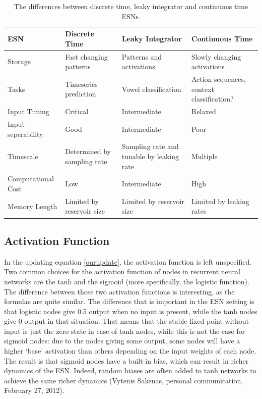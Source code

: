 \documentclass[10pt,a4paper]{report}
\begin{document}
\begin{table}[!h]
\begin{center}
  \begin{tabular}{ | p{2.1cm} | p{2.8cm} | p{2.8cm} | p{2.8cm} | }
    \hline
    ESN & Discrete Time & Leaky Integrator & Continuous Time \\ \hline \hline
    Storage & Fast changing patterns & Patterns and activations & Slowly changing activations \\ \hline
    Tasks  & Timeseries prediction & Vowel classification & Action sequences, context classification? \\ \hline
    Input Timing & Critical & Intermediate & Relaxed \\ \hline
    Input seperability & Good & Intermediate & Poor \\ \hline
    Timescale & Determined by sampling rate & Sampling rate and tunable by leaking rate & Multiple \\ \hline 
    Computational Cost & Low & Intermediate & High \\ \hline
    Memory Length & Limited by reservoir size & Limited by reservoir size & Limited by leaking rates \\ \hline   
  \end{tabular}
\end{center}
\caption{The differences between discrete time, leaky integrator and continuous time ESNs.}
\label{esncomparison}
\end{table}


\subsection*{Activation Function}
In the updating equation \ref{ourupdate}, the activation function is left unspecified. Two common choices for the activation function of nodes in recurrent neural networks are the tanh and the sigmoid (more specifically, the logistic function). The difference between those two activation functions is interesting, as the formulae are quite similar. The difference that is important in the ESN setting is that logistic nodes give 0.5 output when no input is present, while the tanh nodes give 0 output in that situation. That means that the stable fixed point without input is just the zero state in case of tanh nodes, while this is not the case for sigmoid nodes: due to the nodes giving some output, some nodes will have a higher `base' activation than others depending on the input weights of each node. The result is that sigmoid nodes have a built-in bias, which can result in richer dynamics of the ESN. Indeed, random biases are often added to tanh networks to achieve the same richer dynamics (Vytenis Sakenas, personal communication, February 27, 2012).
\end{document}
